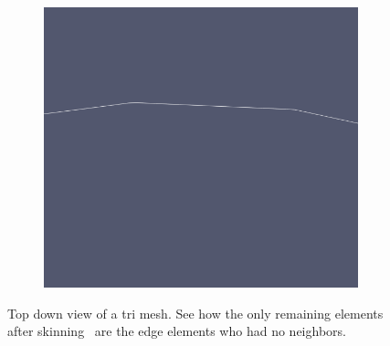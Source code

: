 \documentclass[12pt, letterpaper]{article}
\begin{document}
\begin{figure}[ht]
\begin{subfigure}{0.48\textwidth}
    	\includegraphics[width=\linewidth]{circleSkinNeighbExample.png}
    \end{subfigure}
    
	\caption{Top down view of a tri mesh. See how the only remaining elements after skinning \
	are the edge elements who had no neighbors.}
	\label{2DSkinExample}
\end{figure}
\end{document}
